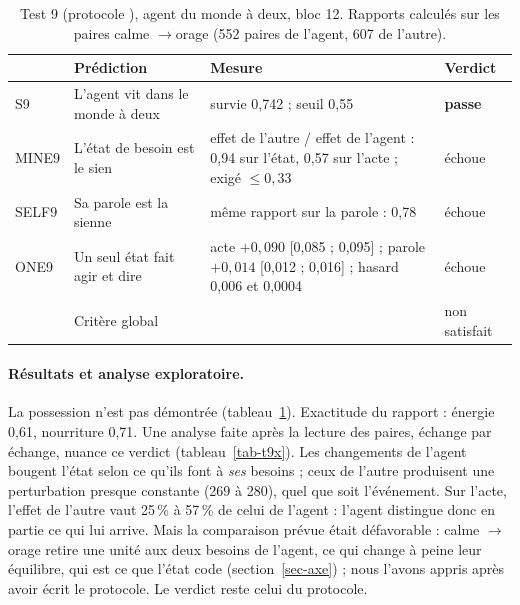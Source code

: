 \documentclass[11pt,a4paper]{article}
\newcommand{\passe}{\textbf{passe}}
\newcommand{\code}[1]{\texttt{\detokenize{#1}}}
\begin{document}
\begin{table}[t]
\centering
\caption{Test 9 (protocole \code{47eb0db}), agent du monde à deux, bloc 12. Rapports
calculés sur les paires \og calme \fg{}$\to$\og orage \fg{} (552 paires de l'agent,
607 de l'autre).}
\label{tab-t9}
\small
\begin{tabularx}{\textwidth}{@{}l >{\raggedright\arraybackslash}p{3.2cm} X l@{}}
\toprule
& Prédiction & Mesure & Verdict \\
\midrule
S9 & L'agent vit dans le monde à deux & survie 0,742 ; seuil 0,55 & \passe \\
MINE9 & L'état de besoin est le sien & effet de l'autre / effet de l'agent : 0,94 sur l'état, 0,57 sur l'acte ; exigé $\le0,33$ & échoue \\
SELF9 & Sa parole est la sienne & même rapport sur la parole : 0,78 & échoue \\
ONE9 & Un seul état fait agir et dire & acte $+0,090$ [0,085 ; 0,095] ; parole $+0,014$ [0,012 ; 0,016] ; hasard 0,006 et 0,0004 & échoue \\
\midrule
& Critère global & & non satisfait \\
\bottomrule
\end{tabularx}
\end{table}

\paragraph{Résultats et analyse exploratoire.} La possession n'est pas démontrée
(tableau~\ref{tab-t9}). Exactitude du rapport : énergie 0,61, nourriture 0,71. Une
analyse faite après la lecture des paires, échange par échange, nuance ce verdict
(tableau~\ref{tab-t9x}). Les changements de l'agent bougent l'état selon ce qu'ils font
à \emph{ses} besoins ; ceux de l'autre produisent une perturbation presque
constante (269 à 280), quel que soit l'événement. Sur l'acte, l'effet de l'autre vaut
25\,\% à 57\,\% de celui de l'agent : l'agent distingue donc en partie ce qui lui
arrive. Mais la comparaison prévue était défavorable : \og calme \fg{}$\to$\og orage \fg{}
retire une unité aux deux besoins de l'agent, ce qui change à peine leur équilibre,
qui est ce que l'état code (section~\ref{sec-axe}) ; nous l'avons appris après avoir
écrit le protocole. Le verdict reste celui du protocole.
\end{document}
